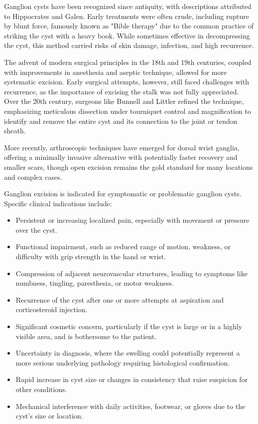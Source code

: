Ganglion cysts have been recognized since antiquity, with descriptions attributed to Hippocrates and Galen. Early treatments were often crude, including rupture by blunt force, famously known as "Bible therapy" due to the common practice of striking the cyst with a heavy book. While sometimes effective in decompressing the cyst, this method carried risks of skin damage, infection, and high recurrence. 

The advent of modern surgical principles in the 18th and 19th centuries, coupled with improvements in anesthesia and aseptic technique, allowed for more systematic excision. Early surgical attempts, however, still faced challenges with recurrence, as the importance of excising the stalk was not fully appreciated. Over the 20th century, surgeons like Bunnell and Littler refined the technique, emphasizing meticulous dissection under tourniquet control and magnification to identify and remove the entire cyst and its connection to the joint or tendon sheath. 

More recently, arthroscopic techniques have emerged for dorsal wrist ganglia, offering a minimally invasive alternative with potentially faster recovery and smaller scars, though open excision remains the gold standard for many locations and complex cases.

Ganglion excision is indicated for symptomatic or problematic ganglion cysts. Specific clinical indications include:

\begin{itemize}
  \item Persistent or increasing localized pain, especially with movement or pressure over the cyst.
  \item Functional impairment, such as reduced range of motion, weakness, or difficulty with grip strength in the hand or wrist.
  \item Compression of adjacent neurovascular structures, leading to symptoms like numbness, tingling, paresthesia, or motor weakness.
  \item Recurrence of the cyst after one or more attempts at aspiration and corticosteroid injection.
  \item Significant cosmetic concern, particularly if the cyst is large or in a highly visible area, and is bothersome to the patient.
  \item Uncertainty in diagnosis, where the swelling could potentially represent a more serious underlying pathology requiring histological confirmation.
  \item Rapid increase in cyst size or changes in consistency that raise suspicion for other conditions.
  \item Mechanical interference with daily activities, footwear, or gloves due to the cyst's size or location.
\end{itemize}

